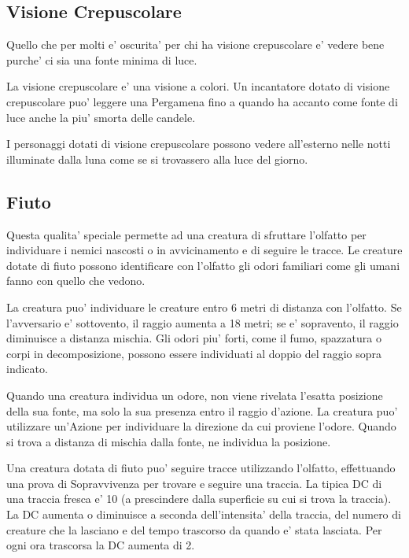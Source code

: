 \documentclass[a4paper,11pt,twoside,openany]{book}
\begin{document}
	\subsection{Visione Crepuscolare}
	
	Quello che per molti e’ oscurita’ per chi ha visione crepuscolare e’ vedere bene purche’ ci sia una fonte minima di luce.
	
	La visione crepuscolare e' una visione a colori.
	Un incantatore dotato di visione crepuscolare puo' leggere una Pergamena fino a quando ha accanto come fonte di luce anche la piu' smorta delle candele.
	
	I personaggi dotati di visione crepuscolare possono vedere all’esterno nelle notti illuminate dalla luna come se si trovassero alla luce del giorno.
	
	\subsection{Fiuto}
	
	Questa qualita’ speciale permette ad una creatura di sfruttare l'olfatto per individuare i nemici nascosti o in avvicinamento e di seguire le tracce. Le creature dotate di fiuto possono identificare con l'olfatto gli odori familiari come gli umani fanno con quello che vedono.
	
	La creatura puo' individuare le creature entro 6 metri di distanza con l'olfatto. Se l'avversario e' sottovento, il raggio aumenta a 18 metri; se e' sopravento, il raggio diminuisce a distanza mischia.
	Gli odori piu' forti, come il fumo, spazzatura o corpi in decomposizione, possono essere individuati al doppio del raggio sopra indicato.
	
	Quando una creatura individua un odore, non viene rivelata l'esatta posizione della sua fonte, ma solo la sua presenza entro il raggio d'azione. La creatura puo' utilizzare un'Azione per individuare la direzione da cui proviene l'odore. Quando si trova a distanza di mischia dalla fonte, ne individua la posizione.
	
	Una creatura dotata di fiuto puo' seguire tracce utilizzando l'olfatto, effettuando una prova di Sopravvivenza per trovare e seguire una traccia. La tipica DC di una traccia fresca e' 10 (a prescindere dalla superficie su cui si trova la traccia). La DC aumenta o diminuisce a seconda dell'intensita' della traccia, del numero di creature che la lasciano e del tempo trascorso da quando e' stata lasciata. Per ogni ora trascorsa la DC aumenta di 2.
	
\end{document}
